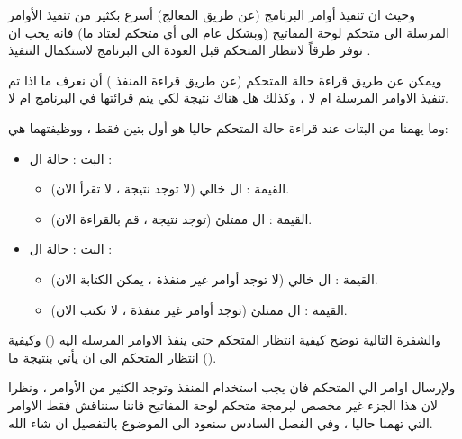 \documentclass[document.tex]{subfiles}
\begin{document}
وحيث ان تنفيذ أوامر البرنامج (عن طريق المعالج) أسرع بكثير من تنفيذ الأوامر المرسلة الى متحكم لوحة المفاتيح (وبشكل عام الى أي متحكم لعتاد ما)  فانه يجب ان نوفر طرقاً لانتظار المتحكم قبل العودة الى البرنامج لاستكمال التنفيذ .

ويمكن عن طريق قراءة حالة المتحكم (عن طريق قراءة المنفذ ) أن نعرف ما اذا تم تنفيذ الاوامر المرسلة ام لا ، وكذلك هل هناك نتيجة لكي يتم قرائتها في البرنامج ام لا.

وما يهمنا من البتات عند قراءة حالة المتحكم حاليا هو أول بتين فقط  ، ووظيفتهما هي:

\begin{itemize}
\item البت : حالة ال :
\begin{itemize}
\item القيمة : ال  خالي (لا توجد نتيجة ، لا تقرأ الان).
\item القيمة : ال  ممتلئ (توجد نتيجة ، قم بالقراءة الان).
\end{itemize}

\item البت : حالة ال :
\begin{itemize}
\item القيمة : ال  خالي (لا توجد أوامر غير منفذة ، يمكن الكتابة الان).
\item القيمة : ال  ممتلئ (توجد أوامر غير منفذة ، لا تكتب الان).
\end{itemize}

\end{itemize}

والشفرة التالية توضح كيفية انتظار المتحكم حتى ينفذ الاوامر المرسله اليه () وكيفية انتظار المتحكم الى ان يأتي بنتيجة ما ().

\begin{english}
\lstset{numberstyle=\tiny,numbers=left,stepnumber=1,numbersep=5pt,tabsize=2,extendedchars=true,breaklines=true,frame=b,showspaces=false, showtabs=false,xleftmargin=10pt,framexleftmargin=10pt,framexrightmargin=5pt,framexbottommargin=4pt,showstringspaces=false,language=[x86masm]Assembler}


\end{english}

ولإرسال اوامر الي المتحكم فان يجب استخدام المنفذ  وتوجد الكثير من الأوامر ، ونظرا لان هذا الجزء غير مخصص لبرمجة متحكم لوحة المفاتيح فاننا سنناقش فقط الاوامر التي تهمنا حاليا ، وفي الفصل السادس سنعود الى الموضوع بالتفصيل ان شاء الله.
\end{document}

